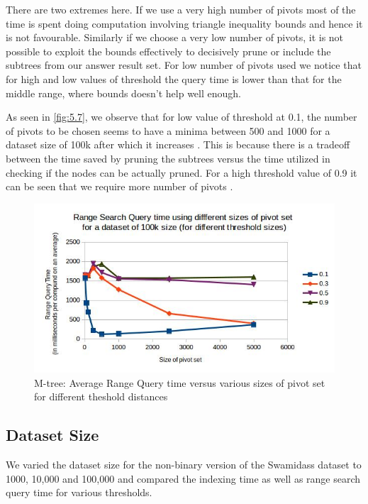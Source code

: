 There are two extremes here. If we use a very high number of pivots most of the time is spent doing computation involving triangle inequality bounds and hence it is not favourable. Similarly if we choose a very low number of pivots, it is not possible to exploit the bounds effectively to decisively prune or include the subtrees from our answer result set. For low number of pivots used we notice that for high and low values of threshold the query time is lower than that for the middle range, where bounds doesn't help well enough.


As seen in \autoref{fig:5.7}, we observe that for low value of threshold at 0.1, the number of pivots to be chosen seems to have a minima between 500 and 1000 for a dataset size of 100k after which it increases . This is because there is a tradeoff between the time saved by pruning the subtrees versus the time utilized in checking if the nodes can be actually pruned.  For a high threshold value of 0.9 it can be seen that we require more number of pivots . 

\begin{figure}[ht!]	
\centering
\includegraphics[width=1 \columnwidth]{img/image5.jpg}
\caption{M-tree: Average Range Query time versus various sizes of pivot set for different theshold distances}
\label{fig:5.7}
\end{figure}



\subsection{Dataset Size}
We varied the dataset size for the non-binary version of the Swamidass dataset to 1000, 10,000 and 100,000 and compared the indexing time as well as range search query time for various thresholds. 


